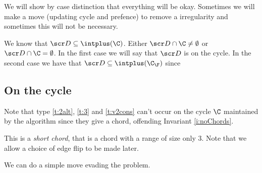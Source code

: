 We will show by case distinction that everything will be okay. Sometimes we will make a move (updating cycle and prefence) to remove a irregularity and sometimes this will not be necessary.



We know that $\D \subseteq \intplus(\C)$. Either $\D \cap \C \neq \emptyset$ or
$\D \cap \C = \emptyset$. In the first case we will say that $\D$ is on the cycle.
In the second case we have that $\D \subseteq \intplus(\C_\F)$ since


\subsection{On the cycle}
  Note that type \ref{t:2alt}, \ref{t:3} and \ref{t:v2cons} can't occur on the cycle $\C$ maintained by the algorithm since they give a chord, offending Invariant \ref{i:noChords}.

  This is a \emph{short chord}, that is a chord with a range of size only 3. Note that we allow a choice of edge flip to be made later.

  We can do a simple move evading the problem.

